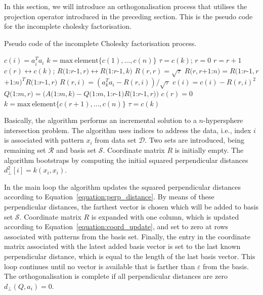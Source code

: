 \documentclass{article}
\newcommand{\x}{x}
\newcommand{\sv}{Q}
\newcommand{\nonsve}{a}
\newcommand{\coordm}{R}
\begin{document}
In this section, we will introduce an orthogonalisation process that
utilises the projection operator introduced in the preceding
section. This is the pseudo code for the incomplete cholesky factorisation.
%
\begin{algorithm}
\caption{Pseudo code of the incomplete Cholesky factorisation process.}%
\label{algorithm:incomplete_cholesky}

\begin{algorithmic}
\STATE $c(i)=a_i^T a_i$
\ENDFOR
\STATE $k = \mathrm{max~element} \{c(1),\ldots,c(n)\}$
\STATE $\tau=c(k)$; $r=0$
\STATE $r=r+1$
\STATE $c(r) \leftrightarrow c(k)$; $R(1$:$r$-$1,r) \leftrightarrow R(1$:$r$-$1,k)$
\STATE $R(r,r) = \sqrt{\tau}$
\STATE $R(r,r$+$1$:$n) = R(1$:$r$-$1,r$+$1$:$n)^T R(1$:$r$-$1,r) $
\STATE $R(r,i) = ( a_k^T a_i - R(r,i) ) / \sqrt{\tau} $
\STATE $c(i) = c(i) - R(r,i)^2$
\ENDFOR
{}
\STATE $Q(1$:$m,r) = ( A(1$:$m,k) - Q(1$:$m,1$:$r$-$1)R( 1$:$r$-$1,r) )$
\ENDIF
\STATE $c(r)= 0 $
\STATE $k = \mathrm{max~element} \{c(r+1),\ldots,c(n)\}$
\STATE $\tau=c(k)$
\ENDWHILE\end{algorithmic}

\end{algorithm}


Basically, the algorithm performs an incremental solution to a $n$-hypersphere
intersection problem. The algorithm uses indices to address the data,
i.e., index $i$ is associated with pattern $\x_{i}$ from data set
$\mathcal{D}$. Two sets are introduced, being remaining set $\mathcal{R}$
and basis set $\mathcal{S}$. Coordinate matrix $\coordm$ is initially
empty. The algorithm bootstraps by computing the initial squared perpendicular
distances $d_{\perp}^{2}[i]=k(\x_{i},\x_{i})$. 

In the main loop the algorithm updates the squared perpendicular distances
according to Equation~\ref{equation:perp_distance}. By means of
these perpendicular distances, the farthest vector is chosen which
will be added to basis set $\mathcal{S}$. Coordinate matrix $\coordm$
is expanded with one column, which is updated according to 
Equation~\ref{equation:coord_update},
and set to zero at rows associated with patterns from the basis set.
Finally, the entry in the coordinate matrix associated with the latest
added basis vector is set to the last known perpendicular distance,
which is equal to the length of the last basis vector. This loop continues
until no vector is available that is farther than $\varepsilon$ from
the basis. The orthogonalisation is complete if all perpendicular
distances are zero $d_{\perp}(\sv,\nonsve_{i})=0$. 
\end{document}
